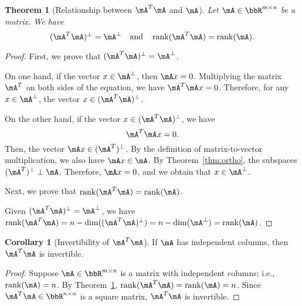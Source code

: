 \documentclass[11pt]{article}
\DeclareMathOperator{\rank}{rank}
\theoremstyle{plain}
\newtheorem{thm}{Theorem}[section]
\theoremstyle{definition}
\newtheorem{cor}{Corollary}
\begin{document}
\begin{thm}[Relationship between $\mA^T \mA$ and $\mA$]\label{thm:aa}Let $\mA \in \bbR^{m \times n}$ be a matrix. We have
	\begin{equation}
		(\mA^T \mA)^{\perp} = \mA^{\perp} \quad \text{and} \quad \rank(\mA^T \mA) = \rank(\mA).
	\end{equation}
\end{thm}
\begin{proof}
	First, we prove that $(\mA^T \mA)^{\perp} = \mA^{\perp}$.
	
	On one hand, if the vector $x \in \mA^{\perp}$, then $\mA x = 0$. Multiplying the matrix $\mA^T$ on both sides of the equation, we have $ \mA^T  \mA x = 0$. Therefore, for any $x \in \mA^{\perp}$, the vector $x \in (\mA^T \mA)^{\perp}$. 
	\iffalse
	
	On the other hand, we  prove  by contradiction that for any $x \in (\mA^T \mA)^{\perp}$ the vector $x \in \mA^{\perp}$.
	
	Suppose there is a vector $x \in (\mA^T \mA^T)^{\perp}$ but $x \notin \mA^{\perp}$. We have
	\begin{equation}\label{eq:aaa}
		\mA x = b \neq 0, \quad \mA^T \mA x = 0 \quad \Rightarrow \quad \mA^T b = 0.
	\end{equation} 
	By the first equality in \eqref{eq:aaa}, $b \in \mA$, and by the third equation in \eqref{eq:aaa}, $ b \in \mA^{T,\perp}$. This contradicts the Theorem~\ref{thm:ortho} that $\mA \perp \mA^{T,\perp}$. Therefore, for any $x \in (\mA^T \mA)^{\perp}$, the vector $x \in \mA^{\perp}$.
	
	\fi
	
	On the other hand, if the vector $x \in (\mA^T \mA)^{\perp}$, we have
	\[ \mA^T \mA x = 0.\]
	Then, the vector $\mA x \in  (\mA^{T})^{\perp}$. By the definition of matrix-to-vector multiplication, we also have $\mA x \in \mA$.  By Theorem~\ref{thm:ortho}, the subspaces $(\mA^{T})^{\perp} \perp \mA$. Therefore, $\mA x = 0$, and we obtain that $x \in \mA^{\perp}$.
	\vspace{0.2cm}
	
	Next, we prove that $\rank(\mA^T \mA) = \rank(\mA)$. 
	
	Given $(\mA^T \mA)^{\perp} = \mA^{\perp}$, we have $\rank(\mA^T \mA) = n - \dim((\mA^T \mA)^{\perp}) = n - \dim(\mA^{\perp}) = \rank(\mA)$.
\end{proof}

\begin{cor}[Invertibility of $\mA^T \mA$]\label{cor:invert}
	If $\mA$ has independent columns, then $\mA^T \mA$ is invertible.
\end{cor}
\begin{proof}
Suppose $\mA \in \bbR^{m \times n}$ is a matrix with independent columns; i.e., $\rank(\mA) = n$. By Theorem~\ref{thm:aa}, $\rank(\mA^T \mA) = \rank(\mA) = n$. Since $\mA^T \mA \in \bbR^{n \times n}$ is a square matrix, $\mA^T \mA$ is invertible.
\end{proof}
\end{document}
